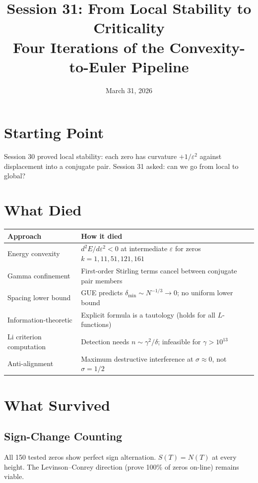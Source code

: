 \documentclass[11pt]{article}
\title{Session 31: From Local Stability to Criticality\\Four Iterations of the Convexity-to-Euler Pipeline}
\author{March 31, 2026}
\date{}
\begin{document}
\maketitle

\section{Starting Point}
Session 30 proved local stability: each zero has curvature $+1/\varepsilon^2$ against displacement into a conjugate pair. Session 31 asked: can we go from local to global?

\section{What Died}

\begin{center}
\begin{tabular}{lp{9cm}}
\toprule
\textbf{Approach} & \textbf{How it died} \\
\midrule
Energy convexity & $d^2E/d\varepsilon^2 < 0$ at intermediate $\varepsilon$ for zeros $k=1,11,51,121,161$ \\
Gamma confinement & First-order Stirling terms cancel between conjugate pair members \\
Spacing lower bound & GUE predicts $\delta_{\min} \sim N^{-1/3} \to 0$; no uniform lower bound \\
Information-theoretic & Explicit formula is a tautology (holds for all $L$-functions) \\
Li criterion computation & Detection needs $n \sim \gamma^2/\delta$; infeasible for $\gamma > 10^{13}$ \\
Anti-alignment & Maximum destructive interference at $\sigma \approx 0$, not $\sigma = 1/2$ \\
\bottomrule
\end{tabular}
\end{center}

\section{What Survived}

\subsection{Sign-Change Counting}
All 150 tested zeros show perfect sign alternation. $S(T) = N(T)$ at every height. The Levinson--Conrey direction (prove 100\% of zeros on-line) remains viable.
\end{document}
